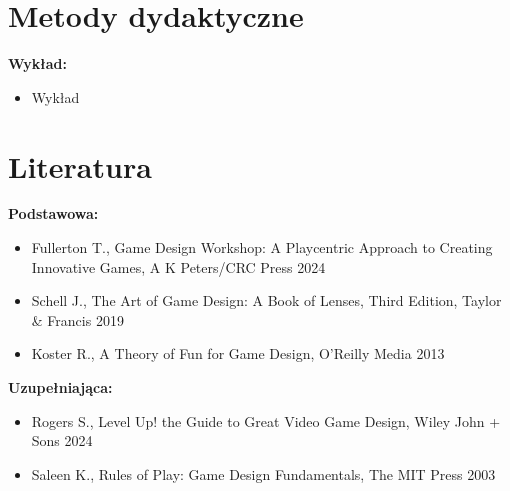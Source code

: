 \documentclass[12pt, a4paper]{article}
\begin{document}
\section{Metody dydaktyczne}

\textbf{Wykład:}
\begin{itemize}
  \item Wykład
\end{itemize}
\vspace{4pt}


\section{Literatura}

\textbf{Podstawowa:}
\begin{itemize}
  \item Fullerton T., Game Design Workshop: A Playcentric Approach to Creating Innovative Games, A K Peters/CRC Press 2024
  \item Schell J., The Art of Game Design: A Book of Lenses, Third Edition, Taylor \& Francis 2019
  \item Koster R., A Theory of Fun for Game Design, O'Reilly Media 2013
\end{itemize}

\textbf{Uzupełniająca:}
\begin{itemize}
  \item Rogers S., Level Up! the Guide to Great Video Game Design, Wiley John + Sons 2024
  \item Saleen K., Rules of Play: Game Design Fundamentals, The MIT Press 2003
\end{itemize}
\end{document}
